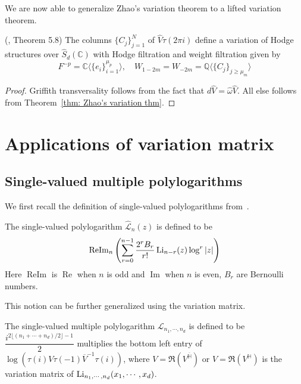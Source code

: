 We are now able to generalize Zhao's variation theorem to a lifted variation theorem.

\begin{theorem}\label{thm: lifted variation thm}(\cite{ZDHZ_HopfAlgebrasOfMultiplePolylogarithmsAndHolomorphicOneForms},  Theorem 5.8)
The columns $\{C_j\}_{j=1}^N$ of $\widehat{V}\tau(2\pi i)$ define a variation of Hodge structures over $\widehat S_d(\mathbb C)$ with Hodge filtration and weight filtration given by
\begin{equation}
F^{-p}=\mathbb C\langle\{e_i\}_{i=1}^{\mu_p}\rangle,\quad W_{1-2m}=W_{-2m}=\mathbb Q\langle\{C_j\}_{j\geq \mu_m}\rangle
\end{equation}
\end{theorem}

\begin{proof}
Griffith transversality follows from the fact that $d\widehat V=\widehat\omega\widehat V$. All else follows from Theorem~\ref{thm: Zhao's variation thm}.
\end{proof}

\section{Applications of variation matrix}

\subsection{Single-valued multiple polylogarithms}

We first recall the definition of single-valued polylogarithms from~\cite{Zagier_TheDilogarithm}.

\begin{definition}\label{def: single valued polylogarithm}
The single-valued polylogarithm $\widehat{\mathcal L}_n(z)$ is defined to be
\begin{equation}
\operatorname{ReIm}_n\left(\sum_{r=0}^{n-1}\frac{2^rB_r}{r!}\operatorname{Li}_{n-r}(z)\log^r|z|\right)
\end{equation}
Here $\operatorname{ReIm}$ is $\operatorname{Re}$ when $n$ is odd and $\operatorname{Im}$ when $n$ is even, $B_r$ are Bernoulli numbers.
\end{definition}

This notion can be further generalized using the variation matrix.

\begin{definition}\cite{Zhao_MultipleZetaFunctionsMultiplePolylogarithmsAndTheirSpecialValues}
The single-valued multiple polylogarithm $\mathcal L_{n_1,\cdots,n_d}$ is defined to be $\dfrac{i^{2\lfloor(n_1+\cdots+n_d)/2\rfloor-1}}{2}$ multiplies the bottom left entry of $\log\left(\tau(i)V\tau(-1)\overline V^{-1}\tau(i)\right)$, where $V=\Re(V^{\overline{\mathbb H}})$ or $V=\Re(V^{\mathbb H})$ is the variation matrix of $\operatorname{Li}_{n_1,\cdots,n_d}(x_1,\cdots,x_d)$.
\end{definition}

